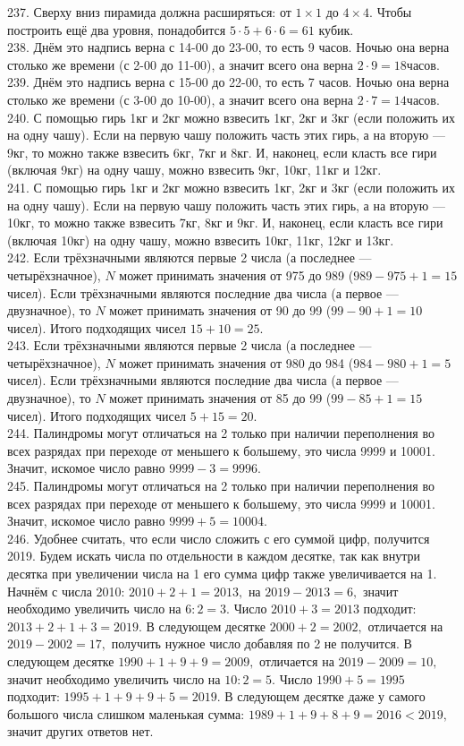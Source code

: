 237. Сверху вниз пирамида должна расширяться: от $1\times1$ до $4\times4.$ Чтобы построить ещё два уровня, понадобится $5\cdot5+6\cdot6=61$ кубик.\\
238. Днём это надпись верна с 14-00 до 23-00, то есть 9 часов. Ночью она верна столько же времени (с 2-00 до 11-00), а значит всего она верна $2\cdot9=18$часов.\\
239. Днём это надпись верна с 15-00 до 22-00, то есть 7 часов. Ночью она верна столько же времени (с 3-00 до 10-00), а значит всего она верна $2\cdot7=14$часов.\\
240. С помощью гирь 1кг и 2кг можно взвесить 1кг, 2кг и 3кг (если положить их на одну чашу). Если на первую чашу положить часть этих гирь, а на вторую --- 9кг, то можно также взвесить 6кг, 7кг и 8кг. И, наконец, если класть все гири (включая 9кг) на одну чашу, можно взвесить 9кг, 10кг, 11кг и 12кг.\\
241. С помощью гирь 1кг и 2кг можно взвесить 1кг, 2кг и 3кг (если положить их на одну чашу). Если на первую чашу положить часть этих гирь, а на вторую --- 10кг, то можно также взвесить 7кг, 8кг и 9кг. И, наконец, если класть все гири (включая 10кг) на одну чашу, можно взвесить 10кг, 11кг, 12кг и 13кг.\\
242. Если трёхзначными являются первые 2 числа (а последнее --- четырёхзначное), $N$ может принимать значения от 975 до 989 ($989-975+1=15$ чисел). Если трёхзначными являются последние два числа (а первое --- двузначное), то $N$ может принимать значения от 90 до 99 ($99-90+1=10$ чисел). Итого подходящих чисел $15+10=25.$\\
243. Если трёхзначными являются первые 2 числа (а последнее --- четырёхзначное), $N$ может принимать значения от 980 до 984 ($984-980+1=5$ чисел). Если трёхзначными являются последние два числа (а первое --- двузначное), то $N$ может принимать значения от 85 до 99 ($99-85+1=15$ чисел). Итого подходящих чисел $5+15=20.$\\
244. Палиндромы могут отличаться на 2 только при наличии переполнения во всех разрядах при переходе от меньшего к большему, это числа 9999 и 10001. Значит, искомое число равно $9999-3=9996.$\\
245. Палиндромы могут отличаться на 2 только при наличии переполнения во всех разрядах при переходе от меньшего к большему, это числа 9999 и 10001. Значит, искомое число равно $9999+5=10004.$\\
246. Удобнее считать, что если число сложить с его суммой цифр, получится 2019. Будем искать числа по отдельности в каждом десятке, так как внутри десятка при увеличении числа на 1 его сумма цифр также увеличивается на 1. Начнём с числа 2010: $2010+2+1=2013,$ на $2019-2013=6,$ значит необходимо увеличить число на $6:2=3.$ Число $2010+3=2013$ подходит: $2013+2+1+3=2019.$ В следующем десятке $2000+2=2002,$ отличается на $2019-2002=17,$ получить нужное число добавляя по 2 не получится. В следующем десятке $1990+1+9+9=2009,$ отличается на $2019-2009=10,$ значит необходимо увеличить число на $10:2=5.$ Число $1990+5=1995$ подходит: $1995+1+9+9+5=2019.$ В следующем десятке даже у самого большого числа слишком маленькая сумма: $1989+1+9+8+9=2016<2019,$ значит других ответов нет.\\
